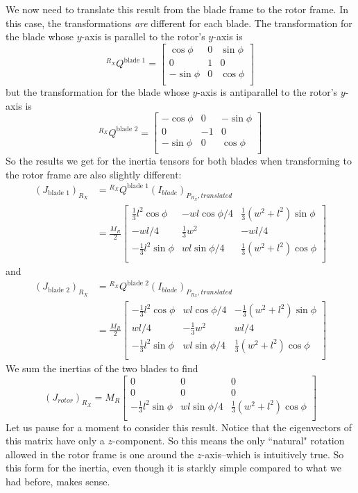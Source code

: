 \documentclass[10pt,letterpaper,final]{article}
\begin{document}
We now need to translate this result from the blade frame to the rotor frame. In this case, the transformations \textit{are} different for each blade. The transformation for the blade whose $y$-axis is parallel to the rotor's $y$-axis is
$$
^{R_X}Q^\text{blade 1} = \begin{bmatrix}
\cos\phi & 0 & \sin\phi \\
0 & 1 & 0 \\
-\sin\phi & 0 & \cos\phi \\
\end{bmatrix}
$$
but the transformation for the blade whose $y$-axis is antiparallel to the rotor's $y$-axis is
$$
^{R_X}Q^\text{blade 2} = \begin{bmatrix}
-\cos\phi & 0 & -\sin\phi \\
0 & -1 & 0 \\
-\sin\phi & 0 & \cos\phi \\
\end{bmatrix}
$$
So the results we get for the inertia tensors for both blades when transforming to the rotor frame are also slightly different:
\begin{align*}
(J_\text{blade 1})_{R_X} &= {}^{R_X}Q^\text{blade 1} (I_{blade})_{P_{R_X}, translated} \\
&= 
\frac{M_R}{2} \begin{bmatrix}
\frac{1}{3} l^2 \cos\phi & -wl\cos\phi/4 & \frac{1}{3}(w^2 + l^2)\sin\phi \\
-wl/4 & \frac{1}{3}w^2 & -wl/4 \\
-\frac{1}{3}l^2 \sin\phi & wl\sin\phi/4 & \frac{1}{3}(w^2 + l^2)\cos\phi \\
\end{bmatrix}
\end{align*}
and
\begin{align*}
(J_\text{blade 2})_{R_X} &= {}^{R_X}Q^\text{blade 2} (I_{blade})_{P_{R_X}, translated} \\
&= 
\frac{M_R}{2} \begin{bmatrix}
-\frac{1}{3} l^2 \cos\phi & wl\cos\phi/4 & -\frac{1}{3}(w^2 + l^2)\sin\phi \\
wl/4 & -\frac{1}{3}w^2 & wl/4 \\
-\frac{1}{3}l^2 \sin\phi & wl\sin\phi/4 & \frac{1}{3}(w^2 + l^2)\cos\phi \\
\end{bmatrix}
\end{align*}
We sum the inertias of the two blades to find
$$(J_{rotor})_{R_X} = M_R \begin{bmatrix}
0 & 0 & 0 \\
0 & 0 & 0 \\
-\frac{1}{3}l^2 \sin\phi & wl\sin\phi/4 & \frac{1}{3}(w^2 + l^2)\cos\phi \\
\end{bmatrix}
$$
Let us pause for a moment to consider this result. Notice that the eigenvectors of this matrix have only a $z$-component. So this means the only ``natural" rotation allowed in the rotor frame is one around the $z$-axis--which is intuitively true. So this form for the inertia, even though it is starkly simple compared to what we had before, makes sense.
\end{document}
